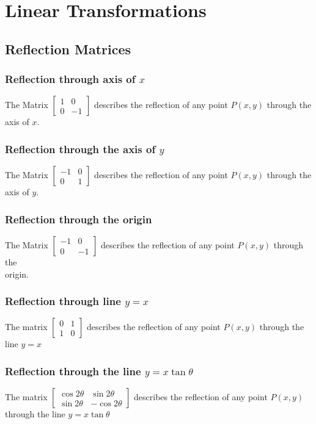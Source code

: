 \documentclass{article}
\begin{document}
\section{Linear Transformations}
\subsection{Reflection Matrices}
\subsubsection{Reflection through axis of $x$}
The Matrix $\begin{bmatrix}
        1 & 0  \\
        0 & -1
    \end{bmatrix}$ describes the reflection of any point $P(x,y)$ through the\\ axis of $x$.

\subsubsection{Reflection through the axis of $y$}
The Matrix $\begin{bmatrix}
        -1 & 0 \\
        0  & 1
    \end{bmatrix}$ describes the reflection of any point $P(x,y)$ through the\\ axis of $y$.

\subsubsection{Reflection through the origin}
The Matrix $\begin{bmatrix}
        -1 & 0  \\
        0  & -1
    \end{bmatrix}$ describes the reflection of any point $P(x,y)$ through the \\ origin.

\subsubsection{Reflection through line $y=x$}
The matrix $\begin{bmatrix}
        0 & 1 \\
        1 & 0
    \end{bmatrix}$ describes the reflection of any point $P(x,y)$ through the line $y=x$

\subsubsection{Reflection through the line $y=x\tan \theta$}
The matrix $\begin{bmatrix}
        \cos 2 \theta & \sin 2 \theta  \\
        \sin 2 \theta & -\cos 2 \theta
    \end{bmatrix}$ describes the reflection of any point $P(x,y)$ through the line $y=x\tan \theta $
\end{document}
